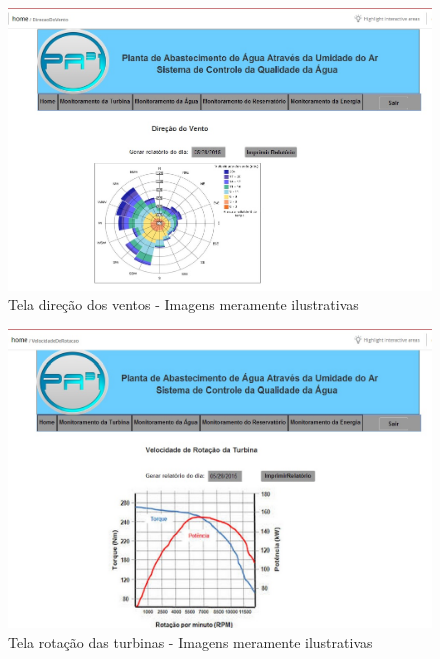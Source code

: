 \begin{center}
\begin{figure}[!ht]
\centering
\includegraphics[scale=0.5]{figuras/direcao_do_vento}
\caption[Tela direção dos ventos]{Tela direção dos ventos - Imagens meramente ilustrativas}
\label{tela_direcao_dos_ventos}
\end{figure}
\clearpage

\begin{figure}[!ht]
\centering
\includegraphics[scale=0.5]{figuras/4}
\caption[Tela rotação das turbinas]{Tela rotação das turbinas - Imagens meramente ilustrativas}
\label{tela_rotacao_das_turbinas}
\end{figure}
\clearpage


\end{center}

